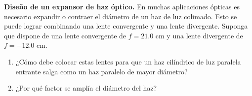 \item \textbf{Diseño de un expansor de haz óptico.}
En muchas aplicaciones ópticas es necesario expandir o contraer el diámetro de un haz de luz colimado. Esto se puede lograr combinando una lente convergente y una lente divergente. Suponga que dispone de una lente convergente de $f = 21.0\text{ cm}$ y una lente divergente de $f = -12.0\text{ cm}$.
\begin{enumerate}
    \item ¿Cómo debe colocar estas lentes para que un haz cilíndrico de luz paralela entrante salga como un haz paralelo de mayor diámetro?
    \item ¿Por qué factor se amplía el diámetro del haz?
\end{enumerate}